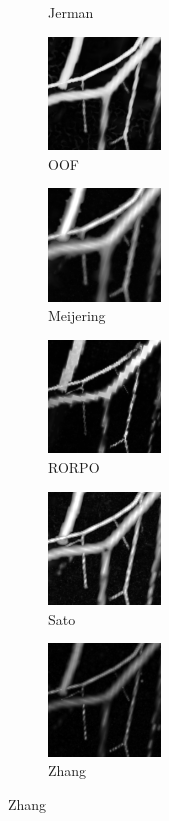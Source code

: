 \begin{figure}[!ht]
\begin{subfigure}[t]{0.24\textwidth}
      \caption{Jerman}
    \end{subfigure}
    \begin{subfigure}[t]{0.24\textwidth}
      \includegraphics[clip = true, trim  =  170 230 150 240, width=30mm]{Images/Vascu_2_k_OOF_GM.png}
      \caption{OOF}
    \end{subfigure}
    \begin{subfigure}[t]{0.24\textwidth}
      \includegraphics[clip = true,trim  =  170 230 150 240, width=30mm]{Images/Vascu_2_k_Meijering.png}
      \caption{Meijering}
    \end{subfigure}
    \begin{subfigure}[t]{0.24\textwidth}
      \includegraphics[clip = true, trim  =  170 230 150 240, width=30mm]{Images/Vascu_2_k_RORPO.png}
      \caption{RORPO}
    \end{subfigure}
    \begin{subfigure}[t]{0.24\textwidth}
      \includegraphics[clip = true, trim  =  170 230 150 240, width=30mm]{Images/Vascu_2_k_Sato.png}
      \caption{Sato}
    \end{subfigure}
    \begin{subfigure}[t]{0.24\textwidth}
      \includegraphics[clip = true, trim  =  170 230 150 240, width=30mm]{Images/Vascu_2_k_Zhang.png}
      \caption{Zhang}
    \end{subfigure}


\end{figure}

